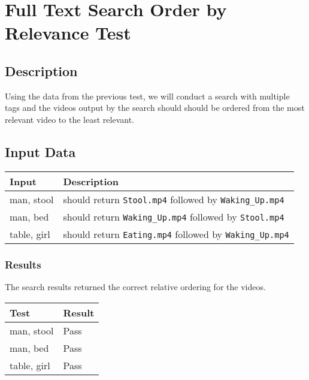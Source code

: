 \documentclass{scrreprt}
\begin{document}
\section{Full Text Search Order by Relevance Test}

\subsection{Description}

Using the data from the previous test, we will conduct a search with multiple tags
and the videos output by the search should should be ordered from the most
relevant video to the least relevant.

\subsection{Input Data}

\begin{table}[H]
        \centering
        \begin{tabular}{p{3cm}p{6cm}}
                \hline\hline
                Input & Description\\
                \hline\hline
                man, stool &  should return \verb|Stool.mp4| followed by \verb|Waking_Up.mp4| \\ %
                \hline
                man, bed &  should return \verb|Waking_Up.mp4| followed by \verb|Stool.mp4| \\ %
                \hline
                table, girl &  should return \verb|Eating.mp4| followed by \verb|Waking_Up.mp4| \\ %
                \hline
        \end{tabular}
\end{table}

\subsubsection{Results}

The search results returned the correct relative ordering for the videos.

\begin{table}[H]
        \centering
        \begin{tabular}{||p{2.5cm}|p{2.5cm}||}
                \hline
                \textbf Test & \textbf Result\\
                \hline\hline
                man, stool &  Pass \\
                \hline
                man, bed &  Pass\\
                \hline
                table, girl &  Pass\\
                \hline
        \end{tabular}
\end{table}
\end{document}

